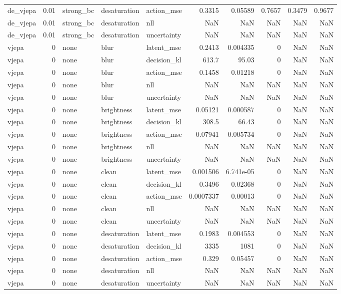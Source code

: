 \begin{tabular}{lrlllrrrrr}
de\_vjepa & 0.01 & strong\_bc & desaturation & action\_mse & 0.3315 & 0.05589 & 0.7657 & 0.3479 & 0.9677 \\
de\_vjepa & 0.01 & strong\_bc & desaturation & nll & NaN & NaN & NaN & NaN & NaN \\
de\_vjepa & 0.01 & strong\_bc & desaturation & uncertainty & NaN & NaN & NaN & NaN & NaN \\
vjepa & 0 & none & blur & latent\_mse & 0.2413 & 0.004335 & 0 & NaN & NaN \\
vjepa & 0 & none & blur & decision\_kl & 613.7 & 95.03 & 0 & NaN & NaN \\
vjepa & 0 & none & blur & action\_mse & 0.1458 & 0.01218 & 0 & NaN & NaN \\
vjepa & 0 & none & blur & nll & NaN & NaN & NaN & NaN & NaN \\
vjepa & 0 & none & blur & uncertainty & NaN & NaN & NaN & NaN & NaN \\
vjepa & 0 & none & brightness & latent\_mse & 0.05121 & 0.000587 & 0 & NaN & NaN \\
vjepa & 0 & none & brightness & decision\_kl & 308.5 & 66.43 & 0 & NaN & NaN \\
vjepa & 0 & none & brightness & action\_mse & 0.07941 & 0.005734 & 0 & NaN & NaN \\
vjepa & 0 & none & brightness & nll & NaN & NaN & NaN & NaN & NaN \\
vjepa & 0 & none & brightness & uncertainty & NaN & NaN & NaN & NaN & NaN \\
vjepa & 0 & none & clean & latent\_mse & 0.001506 & 6.741e-05 & 0 & NaN & NaN \\
vjepa & 0 & none & clean & decision\_kl & 0.3496 & 0.02368 & 0 & NaN & NaN \\
vjepa & 0 & none & clean & action\_mse & 0.0007337 & 0.00013 & 0 & NaN & NaN \\
vjepa & 0 & none & clean & nll & NaN & NaN & NaN & NaN & NaN \\
vjepa & 0 & none & clean & uncertainty & NaN & NaN & NaN & NaN & NaN \\
vjepa & 0 & none & desaturation & latent\_mse & 0.1983 & 0.004553 & 0 & NaN & NaN \\
vjepa & 0 & none & desaturation & decision\_kl & 3335 & 1081 & 0 & NaN & NaN \\
vjepa & 0 & none & desaturation & action\_mse & 0.329 & 0.05457 & 0 & NaN & NaN \\
vjepa & 0 & none & desaturation & nll & NaN & NaN & NaN & NaN & NaN \\
vjepa & 0 & none & desaturation & uncertainty & NaN & NaN & NaN & NaN & NaN \\
\bottomrule
\end{tabular}
